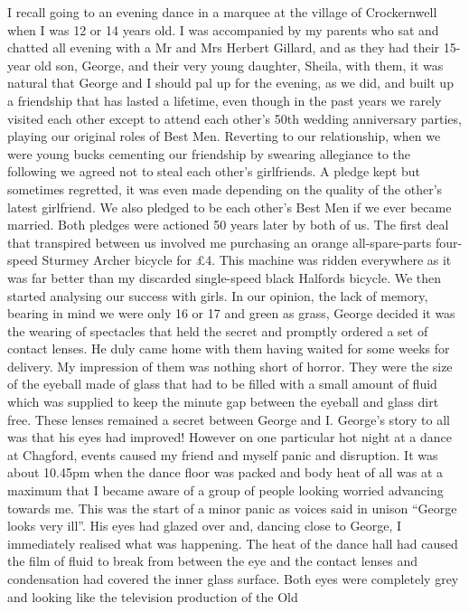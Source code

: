 I recall going to an evening dance in a marquee at the village of Crockernwell
when I was 12 or 14 years old. I was accompanied by my parents who sat and
chatted all evening with a Mr and Mrs Herbert Gillard, and as they had their
15-year old son, George, and their very young daughter, Sheila, with them, it
was natural that George and I should pal up for the evening, as we did, and
built up a friendship that has lasted a lifetime, even though in the past years
we rarely visited each other except to attend each other's 50th wedding
anniversary parties, playing our original roles of Best Men. Reverting to our
relationship, when we were young bucks cementing our friendship by swearing
allegiance to the following we agreed not to steal each other's girlfriends. A
pledge kept but sometimes regretted, it was even made depending on the quality
of the other's latest girlfriend. We also pledged to be each other's Best Men
if we ever became married. Both pledges were actioned 50 years later by both of
us. The first deal that transpired between us involved me purchasing an orange
all-spare-parts four-speed Sturmey Archer bicycle for £4. This machine was
ridden everywhere as it was far better than my discarded single-speed black
Halfords bicycle. We then started analysing our success with girls. In our
opinion, the lack of memory, bearing in mind we were only 16 or 17 and green as
grass, George decided it was the wearing of spectacles that held the secret and
promptly ordered a set of contact lenses. He duly came home with them having
waited for some weeks for delivery. My impression of them was nothing short of
horror. They were the size of the eyeball made of glass that had to be filled
with a small amount of fluid which was supplied to keep the minute gap between
the eyeball and glass dirt free. These lenses remained a secret between George
and I. George's story to all was that his eyes had improved! However on one
particular hot night at a dance at Chagford, events caused my friend and myself
panic and disruption. It was about 10.45pm when the dance floor was packed and
body heat of all was at a maximum that I became aware of a group of people
looking worried advancing towards me. This was the start of a minor panic as
voices said in unison ``George looks very ill''. His eyes had glazed over and,
dancing close to George, I immediately realised what was happening. The heat of
the dance hall had caused the film of fluid to break from between the eye and
the contact lenses and condensation had covered the inner glass surface. Both
eyes were completely grey and looking like the television production of the Old
